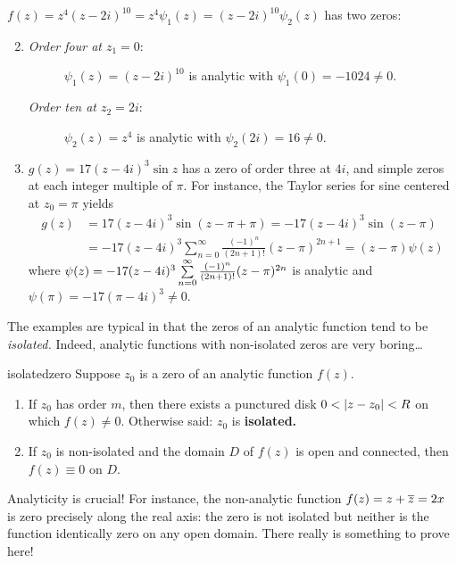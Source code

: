 \goodbreak

\begin{examples}{}{}
	\exstart $f(z)=z^4(z-2i)^{10}=z^4\psi_1(z)=(z-2i)^{10}\psi_2(z)$ has two zeros:
	\begin{enumerate}\setcounter{enumi}{1}
	  \item[]\begin{description}
	  	\item[\normalfont\emph{Order four at $z_1=0$}:] $\psi_1(z)=(z-2i)^{10}$ is analytic with $\psi_1(0)=-1024\neq 0$.
	  	\item[\normalfont\emph{Order ten at $z_2=2i$}:] $\psi_2(z)=z^4$ is analytic with $\psi_2(2i)=16\neq 0$.
	  \end{description}
	  
	
		\item $g(z)=17(z-4i)^3\sin z$ has a zero of order three at $4i$, and simple zeros at each integer multiple of $\pi$. For instance, the Taylor series for sine centered at $z_0=\pi$ yields
		\begin{align*}
			g(z)&=17(z-4i)^3\sin(z-\pi+\pi)
			=-17(z-4i)^3\sin(z-\pi)\\
			&=-17(z-4i)^3\sum_{n=0}^\infty\frac{(-1)^n}{(2n+1)!}(z-\pi)^{2n+1}
			=(z-\pi)\psi(z)	
		\end{align*}
		where $\smash[t]{\psi(z)=-17(z-4i)^3 \sum\limits_{n=0}^\infty\frac{(-1)^n}{(2n+1)!}(z-\pi)^{2n}}$ is analytic and $\psi(\pi)=-17(\pi-4i)^3\neq 0$.
	\end{enumerate}
\end{examples}


The examples are typical in that the zeros of an analytic function tend to be \emph{isolated.} Indeed, analytic functions with non-isolated zeros are very boring\ldots

\begin{thm}{}{isolatedzero}
	Suppose $z_0$ is a zero of an analytic function $f(z)$.
	\begin{enumerate}\itemsep0pt
	  \item If $z_0$ has order $m$, then there exists a punctured disk $0<\left| z-z_0\right|<R$ on which $f(z)\neq 0$. Otherwise said: $z_0$ is \textbf{isolated.}
	  \item If $z_0$ is non-isolated and the domain $D$ of $f(z)$ is open and connected, then $f(z)\equiv 0$ on $D$.
	\end{enumerate}
\end{thm}

\begin{example}{}{}
	Analyticity is crucial! For instance, the non-analytic function $f(z)=z+\overline{z}=2x$ is zero precisely along the real axis: the zero is not isolated but neither is the function identically zero on any open domain. There really is something to prove here!
\end{example}


